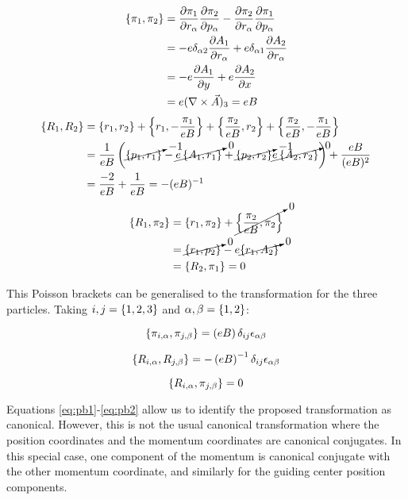\begin{align*}
\left\lbrace \pi_1, \pi_2 \right\rbrace &= \frac{\partial \pi_1}{\partial r_{\alpha}}\frac{\partial \pi_2}{\partial p_{\alpha}} - \frac{\partial \pi_2}{\partial r_{\alpha}}\frac{\partial \pi_1}{\partial p_{\alpha}}\\
&= -e\delta_{\alpha 2}\frac{\partial A_1}{\partial r_{\alpha}} +e\delta_{\alpha 1}\frac{\partial A_2}{\partial r_{\alpha}}\\
&= -e\frac{\partial A_1}{\partial y}  + e\frac{\partial A_2}{\partial x}\\
&= e(\nabla \times \vec{A})_3 = eB
\end{align*}
\begin{align*}
\left\lbrace R_1, R_2 \right\rbrace &= \left\lbrace r_1, r_2 \right\rbrace + \left\lbrace r_1, -\frac{\pi_1}{eB} \right\rbrace +\left\lbrace \frac{\pi_2}{eB}, r_2 \right\rbrace + \left\lbrace \frac{\pi_2}{eB}, -\frac{\pi_1}{eB} \right\rbrace\\
&= \frac{1}{eB}\left( \cancelto{-1}{\left\lbrace p_1, r_1 \right\rbrace}- \cancelto{0}{e\left\lbrace A_1, r_1 \right\rbrace}+\cancelto{-1}{\left\lbrace p_2, r_2 \right\rbrace} \cancelto{0}{e\left\lbrace A_2, r_2 \right\rbrace} \right) +\frac{eB}{(eB)^2}\\
&= \frac{-2}{eB}+ \frac{1}{eB} = -(eB)^{-1}
\end{align*}
\begin{align*}
\left\lbrace R_{1}, \pi_{2} \right\rbrace &= \left\lbrace r_1, \pi_2 \right\rbrace+\cancelto{0}{\left\lbrace \frac{\pi_2}{eB}, \pi_2 \right\rbrace}\\
&= \cancelto{0}{\left\lbrace r_1, p_2 \right\rbrace}-e\cancelto{0}{\left\lbrace r_1, A_2 \right\rbrace}\\
&= \left\lbrace R_2, \pi_1 \right\rbrace = 0
\end{align*}

This Poisson brackets can be generalised to the transformation for the three particles. Taking $i,j = \left\lbrace 1,2, 3 \right\rbrace$ and $\alpha,\beta=\left\lbrace 1, 2 \right\rbrace$:

\begin{equation}
\left\lbrace \pi_{i,\alpha}, \pi_{j,\beta} \right\rbrace=\left( eB \right)\delta_{ij}\epsilon_{\alpha \beta}  
\label{eq:pb1}
\end{equation}

\begin{equation}
\left\lbrace R_{i,\alpha}, R_{j,\beta} \right\rbrace= -\left( eB \right)^{-1} \delta_{ij}\epsilon_{\alpha \beta}  
\label{eq:pb2}
\end{equation}

\begin{equation}
\left\lbrace R_{i,\alpha}, \pi_{j,\beta} \right\rbrace=0 
\label{eq:pb3} 
\end{equation}

Equations \eqref{eq:pb1}-\eqref{eq:pb2} allow us to identify the proposed transformation as canonical. However, this is not the usual canonical transformation where the position coordinates and the momentum coordinates are canonical conjugates. In this special case, one component of the momentum is canonical conjugate with the other momentum coordinate, and similarly for the guiding center position components.\\

